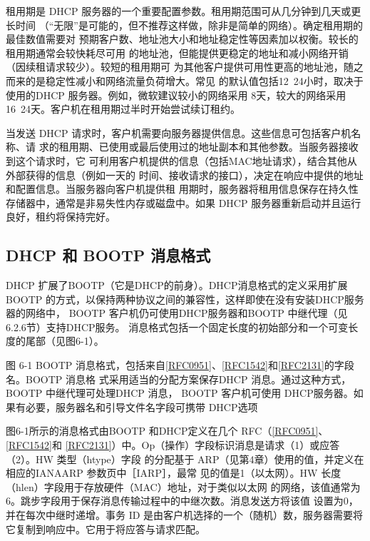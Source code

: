 租用期是 DHCP 服务器的一个重要配置参数。租用期范围可从几分钟到几天或更长时间
（“无限”是可能的，但不推荐这样做，除非是简单的网络）。确定租用期的最佳数值需要对
预期客户数、地址池大小和地址稳定性等因素加以权衡。较长的租用期通常会较快耗尽可用
的地址池，但能提供更稳定的地址和减小网络开销（因续租请求较少）。较短的租用期可
为其他客户提供可用性更高的地址池，随之而来的是稳定性减小和网络流量负荷增大。常见
的默认值包括12~24小时，取决于使用的DHCP 服务器。例如，微软建议较小的网络采用
8天，较大的网络采用16~24天。客户机在租用期过半时开始尝试续订租约。

当发送 DHCP 请求时，客户机需要向服务器提供信息。这些信息可包括客户机名称、请
求的租用期、已使用或最后使用过的地址副本和其他参数。当服务器接收到这个请求时，它
可利用客户机提供的信息（包括MAC地址请求），结合其他从外部获得的信息（例如一天的
时间、接收请求的接口），决定在响应中提供的地址和配置信息。当服务器向客户机提供租
用期时，服务器将租用信息保存在持久性存储器中，通常是非易失性内存或磁盘中。如果
DHCP 服务器重新启动并且运行良好，租约将保持完好。

\subsection{DHCP 和 BOOTP 消息格式}
DHCP 扩展了BOOTP（它是DHCP的前身）。DHCP消息格式的定义采用扩展 BOOTP
的方式，以保持两种协议之间的兼容性，这样即使在没有安装DHCP服务器的网络中，
BOOTP 客户机仍可使用DHCP服务器和BOOTP 中继代理（见6.2.6节）支持DHCP服务。
消息格式包括一个固定长度的初始部分和一个可变长度的尾部（见图6-1）。

图 6-1
BOOTP
消息格式，包括来自\href{https://www.rfc-editor.org/rfc/rfc0951}{\href{https://www.rfc-editor.org/rfc/rfc0951}{[RFC0951]}}、\href{https://www.rfc-editor.org/rfc/rfc1542}{\href{https://www.rfc-editor.org/rfc/rfc1542}{[RFC1542]}}和\href{https://www.rfc-editor.org/rfc/rfc2131}{\href{https://www.rfc-editor.org/rfc/rfc2131}{[RFC2131]}}的字段名。BOOTP
消息格
式采用适当的分配方案保存DHCP 消息。通过这种方式，BOOTP 中继代理可处理DHCP 消息，
BOOTP 客户机可使用 DHCP服务器。如果有必要，服务器名和引导文件名字段可携带 DHCP选项

图6-1所示的消息格式由BOOTP 和DHCP定义在几个
RFC（\href{https://www.rfc-editor.org/rfc/rfc0951}{\href{https://www.rfc-editor.org/rfc/rfc0951}{[RFC0951]}}、\href{https://www.rfc-editor.org/rfc/rfc1542}{\href{https://www.rfc-editor.org/rfc/rfc1542}{[RFC1542]}}和
\href{https://www.rfc-editor.org/rfc/rfc2131}{\href{https://www.rfc-editor.org/rfc/rfc2131}{[RFC2131]}}）中。Op（操作）字段标识消息是请求（1）或应答（2）。HW
类型（htype）字段
的分配基于 ARP（见第4章）使用的值，并定义在相应的IANAARP 参数页中［IARP］，最常
见的值是1（以太网）。HW 长度（hlen）字段用于存放硬件（MAC）地址，对于类似以太网
的网络，该值通常为6。跳步字段用于保存消息传输过程中的中继次数。消息发送方将该值
设置为0，并在每次中继时递增。事务 ID 是由客户机选择的一个（随机）数，服务器需要将
它复制到响应中。它用于将应答与请求匹配。

